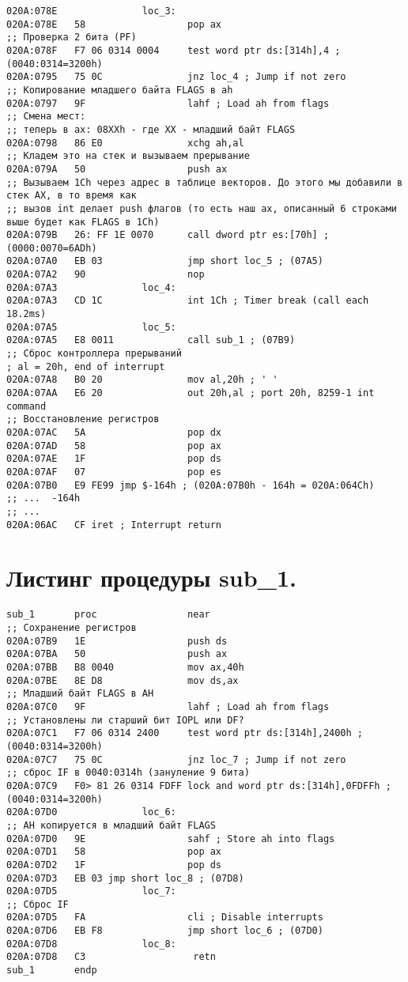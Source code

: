 \begin{lstlisting}[style={asm}]
020A:078E               loc_3:
020A:078E   58                  pop ax
;; Проверка 2 бита (PF)
020A:078F   F7 06 0314 0004     test word ptr ds:[314h],4 ; (0040:0314=3200h)
020A:0795   75 0C               jnz loc_4 ; Jump if not zero
;; Копирование младшего байта FLAGS в ah
020A:0797   9F                  lahf ; Load ah from flags
;; Смена мест: 
;; теперь в ax: 08XXh - где XX - младший байт FLAGS
020A:0798   86 E0               xchg ah,al
;; Кладем это на стек и вызываем прерывание
020A:079A   50                  push ax
;; Вызываем 1Сh через адрес в таблице векторов. До этого мы добавили в стек AX, в то время как
;; вызов int делает push флагов (то есть наш ax, описанный 6 строками выше будет как FLAGS в 1Ch)
020A:079B   26: FF 1E 0070      call dword ptr es:[70h] ; (0000:0070=6ADh)
020A:07A0   EB 03               jmp short loc_5 ; (07A5)
020A:07A2   90                  nop
020A:07A3               loc_4:
020A:07A3   CD 1C               int 1Ch ; Timer break (call each 18.2ms)
020A:07A5               loc_5:
020A:07A5   E8 0011             call sub_1 ; (07B9)
;; Сброс контроллера прерываний
; al = 20h, end of interrupt
020A:07A8   B0 20               mov al,20h ; ' '
020A:07AA   E6 20               out 20h,al ; port 20h, 8259-1 int command
;; Восстановление регистров
020A:07AC   5A                  pop dx
020A:07AD   58                  pop ax
020A:07AE   1F                  pop ds
020A:07AF   07                  pop es
020A:07B0   E9 FE99 jmp $-164h ; (020A:07B0h - 164h = 020A:064Ch)
;; ...  -164h
;; ...
020A:06AC   CF iret ; Interrupt return
\end{lstlisting}

\pagebreak
\section*{Листинг процедуры sub\_1.}
\begin{lstlisting}[style={asm}]
sub_1       proc                near
;; Сохранение регистров
020A:07B9   1E                  push ds
020A:07BA   50                  push ax
020A:07BB   B8 0040             mov ax,40h
020A:07BE   8E D8               mov ds,ax
;; Младший байт FLAGS в AH
020A:07C0   9F                  lahf ; Load ah from flags
;; Установлены ли старший бит IOPL или DF?
020A:07C1   F7 06 0314 2400     test word ptr ds:[314h],2400h ; (0040:0314=3200h)
020A:07C7   75 0C               jnz loc_7 ; Jump if not zero
;; сброс IF в 0040:0314h (зануление 9 бита)
020A:07C9   F0> 81 26 0314 FDFF lock and word ptr ds:[314h],0FDFFh ; (0040:0314=3200h)
020A:07D0               loc_6:
;; AH копируется в младший байт FLAGS
020A:07D0   9E                  sahf ; Store ah into flags
020A:07D1   58                  pop ax
020A:07D2   1F                  pop ds
020A:07D3   EB 03 jmp short loc_8 ; (07D8)
020A:07D5               loc_7:
;; Сброс IF
020A:07D5   FA                  cli ; Disable interrupts
020A:07D6   EB F8               jmp short loc_6 ; (07D0)
020A:07D8               loc_8:
020A:07D8   C3                   retn
sub_1       endp
\end{lstlisting}
